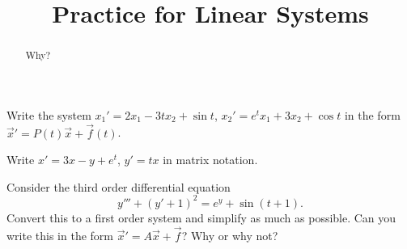 \documentclass{ximera}
\title{Practice for Linear Systems}
\begin{document}
\begin{abstract}
Why?
\end{abstract}
\maketitle



\begin{exercise}
    Write the system $x_1' = 2 x_1 - 3t x_2 + \sin t$, $x_2' = e^t x_1 + 3 x_2 + \cos t$ in the form ${\vec{x}}' = P(t) \vec{x} + \vec{f}(t)$.
\end{exercise}

\begin{exercise}%
    Write $x'=3x-y+e^t$, $y'=tx$ in matrix notation.
\end{exercise}

\begin{exercise}
    Consider the third order differential equation
    \begin{equation*}
        y''' + (y'+1)^2 = e^y + \sin(t+1).
    \end{equation*}
    Convert this to a first order system and simplify as much as possible. Can you write this in the form $\vec{x}' = A\vec{x} + \vec{f}$? Why or why not?
\end{exercise}
\end{document}
